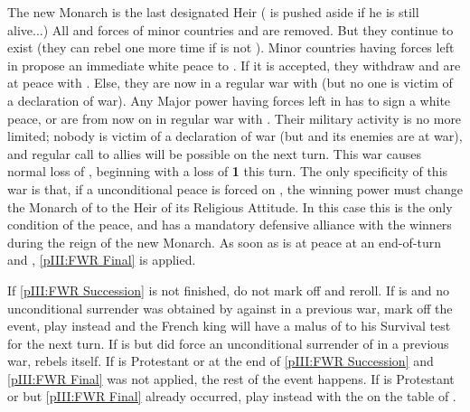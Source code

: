 \begin{digressions}
  \phinter
  \aparag The new Monarch is the last designated Heir ( is
  pushed aside if he is still alive...)
  \aparag All \REVOLT and forces of minor countries \hug and \lig are
  removed. But they continue to exist (they can rebel one more time if \FRA is
  not \CATHCO).
  \bparag Minor countries having forces left in \FRA propose an immediate
  white peace to \FRA. If it is accepted, they withdraw and are at peace with
  \FRA. Else, they are now in a regular war with \FRA (but no one is victim of
  a declaration of war).
  \bparag Any Major power having forces left in \FRA has to sign a white
  peace, or are from now on in regular war with \FRA.  Their military activity
  is no more limited; nobody is victim of a declaration of war (but \FRA and
  its enemies are at war), and regular call to allies will be possible on the
  next turn.  This war causes normal loss of \STAB, beginning with a loss of
  {\bf 1} \STAB this turn.
  \bparag The only specificity of this war is that, if a unconditional peace
  is forced on \FRA, the winning power must change the Monarch of \FRA to the
  Heir of its Religious Attitude.  In this case this is the only condition of
  the peace, and \FRA has a mandatory defensive alliance with the winners
  during the reign of the new Monarch.
  \aparag As soon as \FRA is at peace at an end-of-turn and \CATHCO,
  \ref{pIII:FWR Final} is applied.
\end{digressions}





\condition{}
\aparag If \ref{pIII:FWR Succession} is not finished, do not mark off and
reroll.
\aparag If \FRA is \CATHCO and no unconditional surrender was obtained by \FRA
against \hug in a previous war, mark off the event, play \RD instead and the
French king will have a malus of  to his Survival test for the next
turn.
\aparag If \FRA is \CATHCO but did force an unconditional surrender of \hug in
a previous war, \hug rebels itself.
\aparag If \FRA is Protestant or \CATHCR at the end of \ref{pIII:FWR
  Succession} and \ref{pIII:FWR Final} was not applied, the rest of the event
happens.
\aparag If \FRA is Protestant or \CATHCR but \ref{pIII:FWR Final} already
occurred, play \RD instead with the \REVOLT on the table of \FRA.

